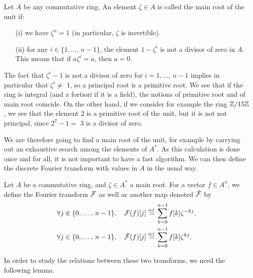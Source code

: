 \begin{defn}
  Let $ A $ be any commutative ring. An element $ \zeta \in A $ is called the main  root of the unit if: \begin{itemize}
\item [{\upshape (i)}] we have $ \zeta^n = 1 $ (in particular, $ \zeta $ is invertible).
\item [{\upshape (ii)}] for any $ i \in \{1, \ldots, \, n-1\} $, the element $ 1 - \zeta^i $ is not a divisor of zero in $ A $. This means that if $ a \zeta^i = a $, then $ a = 0 $.
\end{itemize}
\end{defn}
 
 
\begin{rem}
 The fact that $ \zeta^i-1 $ is not a divisor of zero for $ i = 1, \ldots, \, n-1 $ implies in particular that $ \zeta^i \neq $ 1, so a principal root is a primitive root. We see that if the ring is integral (and a fortiori if it is a field), the notions of primitive  root and of main  root coincide. On the other hand, if we consider for example the ring $ \mathbb{Z}/15 \mathbb{Z} $, we see that the element $ 2 $ is a primitive root  of the unit, but it is not not principal, since $ 2^2-1 = $ 3 is a divisor of zero.
\end{rem}
We are therefore going to find a main root of the unit, for example by carrying out an exhaustive search among the elements of $ A^* $. As this calculation is done once and for all, it is not important to have a fast algorithm. We can then define the discrete Fourier transform with values in $ A $ in the usual way.
 
\begin{defn}
Let $ A $ be a commutative ring, and $ \zeta \in A^* $ a main  root. For a vector $ f \in A^n $, we define the Fourier transform $ \mathcal{F} $ as well as another map denoted $ \tilde{\mathcal{F}} $ by
\begin{align}
\label{eq-defn-transform-ring}
\forall j \in \{0, \ldots, \, n-1\}, \quad \mathcal{F}(f) [j] & \stackrel{\mbox{\upshape\tiny def.}}{=} \sum_{k = 0}^{n-1}{f [k ] \zeta^{- kj}}, \\
\forall j \in \{0, \ldots, \, n-1\}, \quad \tilde{\mathcal{F}} (f) [j] & \stackrel{\mbox{\upshape\tiny def.}}{=} \sum_{k = 0}^{n-1}{f [k] \zeta^{kj}}.
\end{align}
\end{defn}
In order to study the relations between these two transforms, we need the following lemma.
 
